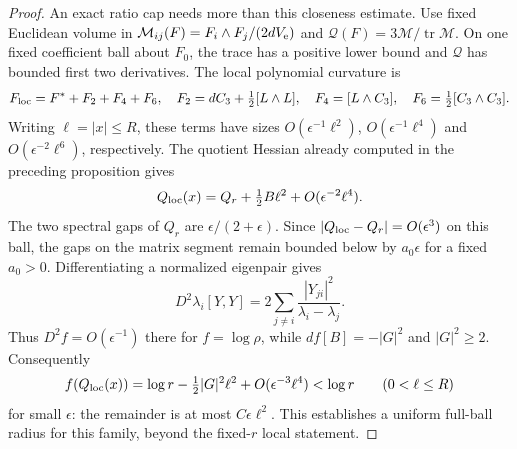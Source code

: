 \documentclass[11pt]{article}
\numberwithin{equation}{section}
\theoremstyle{definition}
\theoremstyle{remark}
\DeclareMathOperator{\tr}{tr}
\begin{document}
\begin{proof}
An exact ratio cap needs more than this closeness estimate.
Use fixed Euclidean volume in
$\mathcal M_{ij}(F)=F_i\wedge F_j/(2dV_{\rm e})$ and
$\mathcal Q(F)=3\mathcal M/\tr\mathcal M$.
On one fixed coefficient ball about $F_0$, the trace
has a positive lower bound and $\mathcal Q$ has bounded
first two derivatives. The local polynomial curvature is
\[
 F_{\rm loc}=F^*+F_2+F_4+F_6,
 \quad F_2=dC_3+\tfrac12[L\wedge L],\quad
 F_4=[L\wedge C_3],\quad F_6=\tfrac12[C_3\wedge C_3].
\]
Writing $\ell=|x|\le R$, these terms have sizes
$O(\epsilon^{-1}\ell^2)$,
$O(\epsilon^{-1}\ell^4)$ and
$O(\epsilon^{-2}\ell^6)$, respectively. The quotient
Hessian already computed in the preceding proposition gives
\[
 Q_{\rm loc}(x)=Q_r+\tfrac12B\ell^2
                         +O(\epsilon^{-2}\ell^4).
\]
The two spectral gaps of $Q_r$ are $\epsilon/(2+\epsilon)$.
Since $|Q_{\rm loc}-Q_r|=O(\epsilon^3)$ on this ball,
the gaps on the matrix segment remain bounded below by
$a_0\epsilon$ for a fixed $a_0>0$. Differentiating a
normalized eigenpair gives
\[
 D^2\lambda_i[Y,Y]
       =2\sum_{j\ne i}\frac{|Y_{ji}|^2}{\lambda_i-\lambda_j}.
\]
Thus $D^2f=O(\epsilon^{-1})$ there for $f=\log\rho$,
while $df[B]=-|G|^2$ and $|G|^2\ge2$. Consequently
\begin{equation}\label{eq:uniform-local-ratio-cap}
 f(Q_{\rm loc}(x))=\log r-\tfrac12|G|^2\ell^2
                              +O(\epsilon^{-3}\ell^4)<\log r
                  \qquad(0<\ell\le R)
\end{equation}
for small $\epsilon$: the remainder is at most
$C\epsilon\ell^2$. This establishes a uniform full-ball
radius for this family, beyond the fixed-$r$ local statement.


\end{proof}
\end{document}
